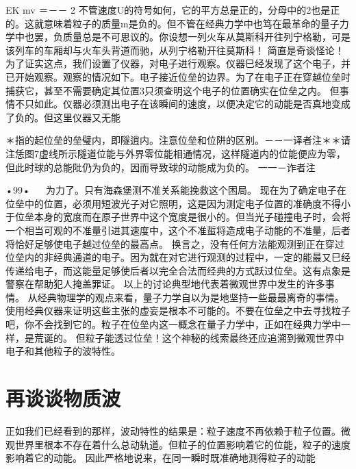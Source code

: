 EK
mv
＝－－
2
不管速度U的符号如何，它的平方总是正的，分母中的2也是正的。这就意味着粒子的质量m是负的。但不管在经典力学中也笃在最革命的量子力学中也罢，负质量总是不可思议的。你设想一列火车从莫斯科开往列宁格勒，可是该列车的车厢却与火车头背道而驰，从列宁格勒开往莫斯科！
简直是奇谈怪论！为了证实这点，我们设置了仪器，对电子进行观察。仪器巳经发现了这个电子，并已开始观察。观察的情况如下。电子接近位垒的边界。为了在电子正在穿越位垒时捕获它，甚至不需要确定其位置3只须查明这个电子的位置确实在位垒之内。
但事情不只如此。仪器必须测出电子在该瞬间的速度，以便决定它的动能是否真地变成了负的。但这里仪器又无能

＊指的起位垒的垒璧内，即隧逍内。注意位垒和位阱的区别。－－一译者注＊＊请注恁图7虚线所示隧道位能与外界零位能相通情况，这样隧道内的位能便应为零，但此时球的总能阰仍为负的，因而导致球的动能成为负的。
一一－诈者注

•99•
  
为力了。只有海森堡测不准关系能挽救这个困局。
现在为了确定电子在位垒中的位置，必须用短波光子对它照明，这是因为测定电子位置的准确度不得小于位垒本身的宽度而在原子世界中这个宽度是很小的。但当光子碰撞电子时，会将一个相当可观的不准量引进其速度中，这个不准蜇将造成电子动能的不准量，后者将恰好足够使电子越过位垒的最高点。
换言之，没有任何方法能观测到正在穿过位垒内的非经典通道的电子。因为就在对它进行观测的过程中，一定的能最又巳经传递给电子，而这能量足够使后者以完全合法而经典的方式跃过位垒。这有点象是警察在帮助犯人掩盖罪证。
以上的讨论典型地代表着微观世界中发生的许多事情。
从经典物理学的观点来看，量子力学自以为是地坚持一些最最离奇的事情。使用经典仪器来证明这些主张的虚妄是根本不可能的。不要在位垒之中去寻找粒子吧，你不会找到它的。粒子在位垒内这一概念在量子力学中，正如在经典力学中一样，是荒诞的。
但粒子能透过位垒！这个神秘的线索最终还应追溯到微观世界中电子和其他粒子的波特性。

\section{再谈谈物质波}

正如我们已经看到的那样，波动特性的结果是：粒子速度不再依赖于粒子位置。微观世界里根本不存在着什么总动轨道。但粒子的位置影响着它的位能，粒子的速度影响着它的动能。
因此严格地说来，在同一瞬时既准确地测得粒子的动能

